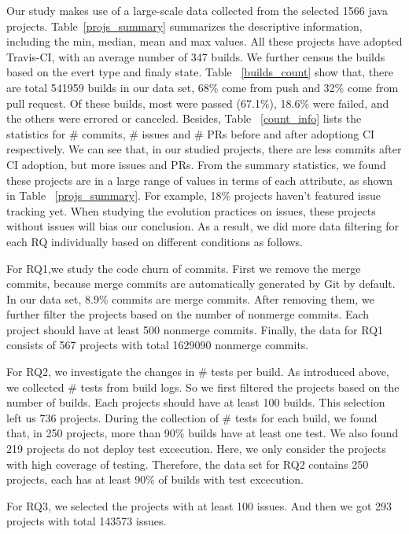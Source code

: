 Our study makes use of a large-scale data collected from the selected 1566 java projects. Table~\ref{projs_summary} summarizes the descriptive information, including the min, median, mean and max values. All these projects have adopted Travis-CI, with an average number of 347 builds. We further census the builds based on the evert type and finaly state. Table ~\ref{builds_count} show that, there are total 541959 builds in our data set, 68\% come from push and 32\% come from pull request. Of these builds, most were passed (67.1\%), 18.6\% were failed, and the others were errored or canceled. Besides, Table ~\ref{count_info} lists the statistics for \# commits, \# issues and \# PRs before and after adoptiong CI respectively. We can see that, in our studied projects, there are less commits after CI adoption, but more issues and PRs. From the summary statistics, we found these projects are in a large range of values in terms of each attribute, as shown in Table ~\ref{projs_summary}. For example, 18\% projects haven't featured issue tracking yet. When studying the evolution practices on issues, these projects without issues will bias our conclusion. As a result, we did more data filtering for each RQ individually based on different conditions as follows.

For RQ1,we study the code churn of commits. First we remove the merge commits, because merge commits are automatically generated by Git by default. In our data set, 8.9\% commits are merge commits. After removing them, we further filter the projects based on the number of nonmerge commits. Each project should have at least 500 nonmerge commits. Finally, the data for RQ1 consists of 567 projects with total 1629090 nonmerge commits.

For RQ2,  we investigate the changes in \# tests per build.
As introduced above, we collected \# tests from build logs. So we first filtered the projects based on the number of builds. Each projects should have at least 100 builds. This selection left us 736 projects. 
During the collection of \# tests for each build, we found that, in 250 projects, more than 90\% builds have at least one test. We also found 219 projects do not deploy test excecution.  Here, we only consider the projects with high coverage of testing. Therefore, the data set for RQ2 contains 250 projects, each has at least 90\% of builds with test excecution. 

For RQ3, we selected the projects with at least 100 issues. And then we got 293 projects with total 143573 issues.


